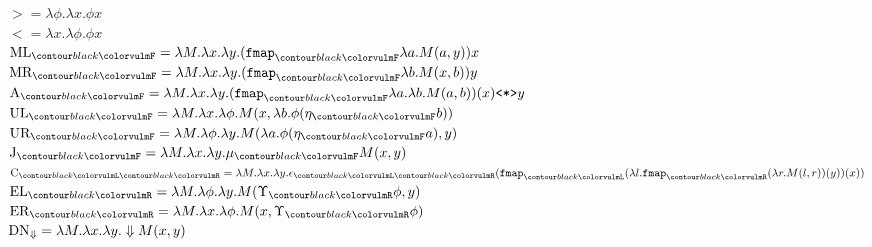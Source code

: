 \def\arraystretch{1.5}
\begin{multicols}{2}
	$	>                    = \lambda \phi. \lambda x. \phi x $\\[1.5ex]
	$ <                    = \lambda x. \lambda \phi. \phi x $\\[1.5ex]
	$ \combML_{\f{F}}      = \lambda M. \lambda x. \lambda y. (\fmap_{\f{F}} \lambda a. M(a, y)) x $\\[1.5ex]
	$ \combMR_{\f{F}}      = \lambda M. \lambda x. \lambda y. (\fmap_{\f{F}} \lambda b. M(x, b)) y $\\[1.5ex]
	$	\combA_{\f{F}}       = \lambda M. \lambda x. \lambda y. (\fmap_{\f{F}}\lambda a. \lambda b. M(a, b))(x) \texttt{<*>} y $\\[1.5ex]
	$	\combUL_{\f{F}}      = \lambda M. \lambda x. \lambda \phi. M(x, \lambda b. \phi(\eta_{\f{F}} b))$\\[1.5ex]
	$	\combUR_{\f{F}}      = \lambda M. \lambda \phi. \lambda y. M(\lambda a. \phi(\eta_{\f{F}} a),y) $\\[1.5ex]
	$ \combJ_{\f{F}}       = \lambda M. \lambda x. \lambda y. \mu_{\f{F}} M(x, y) $\\[1.5ex]
	$	\combC_{\f{L}\f{R}}  = \lambda M. \lambda x. \lambda y. \epsilon_{\f{L}\f{R}}(\fmap_{\f{L}}(\lambda l. \fmap_{\f{R}}(\lambda r. M(l, r))(y)) (x)) $\\[1.5ex]
	$	\combEL_{\f{R}}      = \lambda M. \lambda \phi. \lambda y. M(\Upsilon_{\f{R}} \phi, y)$\\[1.5ex]
	$	\combER_{\f{R}}      = \lambda M. \lambda x. \lambda \phi. M(x, \Upsilon_{\f{R}} \phi)$\\[1.5ex]
	$	\text{DN}_{\Downarrow} = \lambda M. \lambda x. \lambda y. \Downarrow M(x, y)$
\end{multicols}
